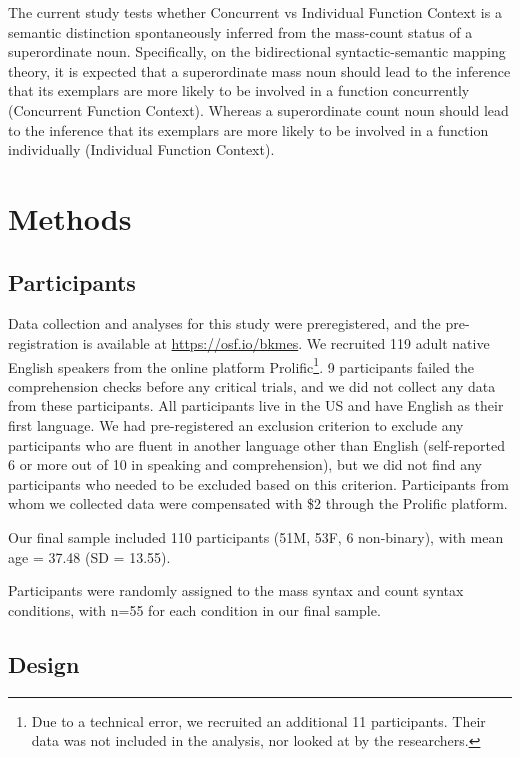 \documentclass[
  man,floatsintext]{apa6}
\begin{document}
The current study tests whether Concurrent vs Individual Function Context is a semantic distinction spontaneously inferred from the mass-count status of a superordinate noun. Specifically, on the bidirectional syntactic-semantic mapping theory, it is expected that a superordinate mass noun should lead to the inference that its exemplars are more likely to be involved in a function concurrently (Concurrent Function Context). Whereas a superordinate count noun should lead to the inference that its exemplars are more likely to be involved in a function individually (Individual Function Context).

\hypertarget{methods}{%
\section{Methods}\label{methods}}

\hypertarget{participants}{%
\subsection{Participants}\label{participants}}

Data collection and analyses for this study were preregistered, and the pre-registration is available at \url{https://osf.io/bkmes}. We recruited 119 adult native English speakers from the online platform Prolific\footnote{Due to a technical error, we recruited an additional 11 participants. Their data was not included in the analysis, nor looked at by the researchers.}. 9 participants failed the comprehension checks before any critical trials, and we did not collect any data from these participants. All participants live in the US and have English as their first language. We had pre-registered an exclusion criterion to exclude any participants who are fluent in another language other than English (self-reported 6 or more out of 10 in speaking and comprehension), but we did not find any participants who needed to be excluded based on this criterion. Participants from whom we collected data were compensated with \$2 through the Prolific platform.

Our final sample included 110 participants (51M, 53F, 6 non-binary), with mean age = 37.48 (SD = 13.55).

Participants were randomly assigned to the mass syntax and count syntax conditions, with n=55 for each condition in our final sample.

\hypertarget{design}{%
\subsection{Design}\label{design}}
\end{document}
